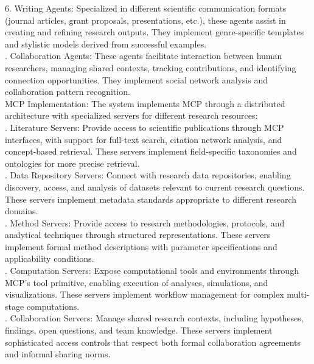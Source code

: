 6. Writing Agents: Specialized in different scientific communication formats (journal articles, grant proposals, presentations, etc.), these agents assist in creating and refining research outputs. They implement genre-specific templates and stylistic models derived from successful examples.\\ . Collaboration Agents: These agents facilitate interaction between human researchers, managing shared contexts, tracking contributions, and identifying connection opportunities. They implement social network analysis and collaboration pattern recognition.\\ \newline
MCP Implementation: The system implements MCP through a distributed architecture with specialized servers for different research resources:\\ . Literature Servers: Provide access to scientific publications through MCP interfaces, with support for full-text search, citation network analysis, and concept-based retrieval. These servers implement field-specific taxonomies and ontologies for more precise retrieval.\\ . Data Repository Servers: Connect with research data repositories, enabling discovery, access, and analysis of datasets relevant to current research questions. These servers implement metadata standards appropriate to different research domains.\\ . Method Servers: Provide access to research methodologies, protocols, and analytical techniques through structured representations. These servers implement formal method descriptions with parameter specifications and applicability conditions.\\ . Computation Servers: Expose computational tools and environments through MCP's tool primitive, enabling execution of analyses, simulations, and visualizations. These servers implement workflow management for complex multi-stage computations.\\ . Collaboration Servers: Manage shared research contexts, including hypotheses, findings, open questions, and team knowledge. These servers implement sophisticated access controls that respect both formal collaboration agreements and informal sharing norms.\\ \newline
